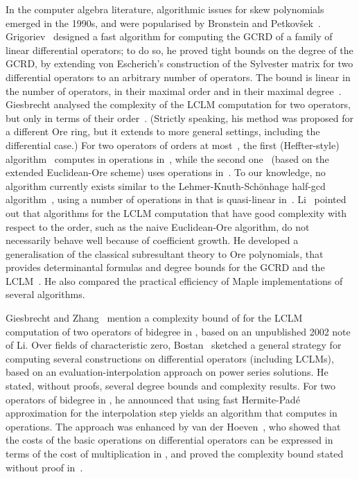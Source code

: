 \documentclass{sig-alt-full}
\begin{document}
In the computer algebra literature, algorithmic issues for skew polynomials
emerged in the 1990s, and were popularised by Bronstein and
Petkov{\v{s}}ek~\cite{BrPe94,BrPe96}. 
Grigoriev~\cite[\S6]{Grigoriev90} designed a fast algorithm for computing the
GCRD of a family of linear differential operators; to do so, he proved tight
bounds on the degree of the GCRD, by extending von Escherich's construction of
the Sylvester matrix for two differential operators to an arbitrary number of
operators. The bound is linear in the number of operators, in their maximal
order and in their maximal degree~\cite[Lemma~5.1]{Grigoriev90}.
Giesbrecht analysed the complexity of the
LCLM computation for two operators, but only in terms of their order~\cite{Giesbrecht92,Giesbrecht98}.
(Strictly speaking, his method was proposed for a different Ore ring, but it
extends to more general settings, including the differential case.) For two
operators  of orders at most~, the first (Heffter-style)
algorithm~\cite[Lemma~5]{Giesbrecht92}  computes  in
 operations in~, while the second
one~\cite[Lemma~2.1]{Giesbrecht98} (based on the extended Euclidean-Ore scheme) uses
 operations in~. To our knowledge, no algorithm currently exists similar
to the Lehmer-Knuth-Sch\"onhage half-gcd algorithm~\cite[Chapter~11]{GaGe03},
using a number of operations in  that is quasi-linear in~. 
Li~\cite{Li98} pointed out that algorithms for the LCLM computation that have
good complexity with respect to the order, such as the naive Euclidean-Ore
algorithm, do not necessarily behave well because of coefficient growth.
He developed a generalisation of the classical subresultant theory to Ore
polynomials, that provides determinantal formulas and degree bounds for the
GCRD and the LCLM~\cite{Li98}. He also compared the practical
efficiency of Maple implementations of several algorithms.

Giesbrecht and Zhang~\cite[Theorem~2.1]{GiZh03} mention a complexity
bound of  for the LCLM computation of two operators of bidegree
 in , based on an unpublished 2002 note of Li.
Over fields of characteristic zero,
Bostan~\cite[Chapter~10]{Bostan03} sketched a general strategy for computing
several constructions on differential operators (including LCLMs), based on an
evaluation-interpolation approach on power series solutions. He stated,
without proofs, several degree bounds and complexity results. For two
operators  of bidegree  in , he announced that using
fast Hermite-Padé approximation for the interpolation step yields an algorithm
that computes  in  operations. 
The approach was enhanced by van der Hoeven~\cite{VdHoeven11},
who showed that the costs of the basic operations on
differential operators can be expressed in terms of the cost of multiplication
in , and proved
the complexity bound  stated without proof in~\cite[\S10.5]{Bostan03}.
\end{document}
